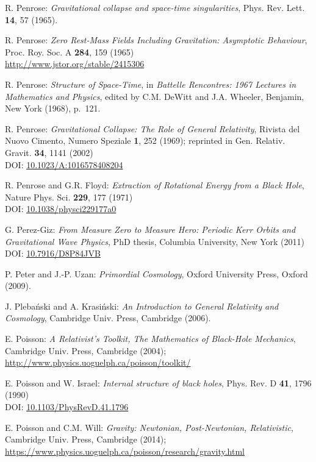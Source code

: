 \begin{thebibliography}{123}
R. Penrose: {\em Gravitational collapse and space-time singularities},
Phys. Rev. Lett. {\bf 14}, 57 (1965).

R. Penrose:
{\em Zero Rest-Mass Fields Including Gravitation: Asymptotic Behaviour},
Proc. Roy. Soc. A {\bf 284}, 159 (1965)\\
\url{http://www.jstor.org/stable/2415306}

R. Penrose: {\em Structure of Space-Time},
in {\em Battelle Rencontres: 1967 Lectures in Mathematics and Physics},
edited by C.M. DeWitt and J.A. Wheeler,
Benjamin, New York (1968), p.~121.

R. Penrose: {\em Gravitational Collapse: The Role of General Relativity},
Rivista del Nuovo Cimento, Numero Speziale {\bf 1}, 252 (1969); reprinted in
Gen. Relativ. Gravit. {\bf 34}, 1141 (2002)\\
DOI: \href{https://doi.org/10.1023/A:1016578408204}{10.1023/A:1016578408204}

R. Penrose and G.R. Floyd: {\em Extraction of Rotational Energy from
a Black Hole},  Nature Phys. Sci. {\bf 229}, 177 (1971)\\
DOI: \href{https://doi.org/10.1038/physci229177a0}{10.1038/physci229177a0}

G. Perez-Giz: {\em From Measure Zero to Measure Hero:
Periodic Kerr Orbits and Gravitational Wave Physics},
PhD thesis, Columbia University, New York (2011)\\
DOI: \href{https://doi.org/10.7916/D8P84JVB}{10.7916/D8P84JVB}

P. Peter and J.-P. Uzan: {\em Primordial Cosmology},
Oxford University Press, Oxford (2009).

J. Pleba\'nski and A. Krasi\'nski:
{\em An Introduction to General Relativity and Cosmology},
Cambridge Univ. Press, Cambridge (2006).

E. Poisson: \emph{A Relativist's Toolkit,
The Mathematics of Black-Hole Mechanics},
Cambridge Univ. Press, Cambridge (2004); \\
\url{http://www.physics.uoguelph.ca/poisson/toolkit/}

E. Poisson and W. Israel: {\em Internal structure of black holes},
Phys. Rev. D {\bf 41}, 1796 (1990) \\
DOI: \href{https://doi.org/10.1103/PhysRevD.41.1796}{10.1103/PhysRevD.41.1796}

E. Poisson and C.M. Will: {\em Gravity: Newtonian, Post-Newtonian, Relativistic},
Cambridge Univ. Press, Cambridge (2014); \\
\url{https://www.physics.uoguelph.ca/poisson/research/gravity.html}


\end{thebibliography}
